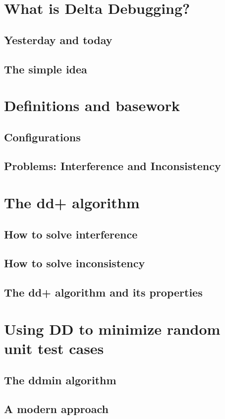 


	
\section{What is Delta Debugging?}
\subsection{Yesterday and today}
\subsection{The simple idea}

\section{Definitions and basework}
\subsection{Configurations}
\subsection{Problems: Interference and Inconsistency}

\section{The dd+ algorithm}
\subsection{How to solve interference}
\subsection{How to solve inconsistency}
\subsection{The dd+ algorithm and its properties}

\section{Using DD to minimize random unit test cases}
\subsection{The ddmin algorithm}
\subsection{A modern approach}


